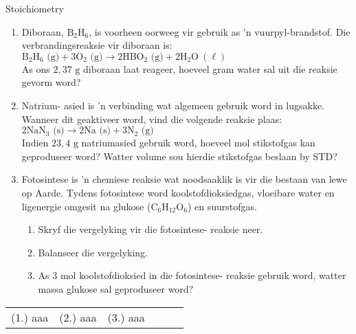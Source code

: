 \begin{exercises}{Stoichiometry}
            \nopagebreak \noindent
      \label{m38712*id285393}\begin{enumerate}[noitemsep, label=\textbf{\arabic*}. ] 
            \label{m38712*uid101}\item Diboraan, $\text{B}{}_{2}\text{H}{}_{6}$, is voorheen oorweeg vir gebruik as 'n vuurpyl-brandstof. Die verbrandingsreaksie vir diboraan is:\\
${\text{B}}_{2}{\text{H}}_{6} \text{ (g)} + 3{\text{O}}_{2} \text{ (g)} \to 2\text{H}\text{B}{\text{O}}_{2} \text{ (g)} + 2{\text{H}}_{2}\text{O} ~\left( \ell \right)$\\
As ons $2,37 \text{ g}$ diboraan laat reageer, hoeveel gram water sal uit die reaksie gevorm word?
\item Natrium- asied is 'n verbinding wat algemeen gebruik word in lugsakke. Wanneer dit geaktiveer word, vind die volgende reaksie plaas: \\
$2{\text{NaN}}_{3} \text{ (s)} \to 2\text{Na} \text{ (s)} + 3{\text{N}}_{2} \text{ (g)}$\\
Indien $23,4 \text{ g}$ natriumasied gebruik word, hoeveel mol stikstofgas kan geproduseer word? Watter volume sou hierdie stikstofgas beslaan by STD?
\label{m38712*uid103}\item Fotosintese is 'n chemiese reaksie wat noodsaaklik is vir die bestaan ​​van lewe op
         Aarde. Tydens fotosintese word koolstofdioksiedgas, vloeibare water en ligenergie omgesit na glukose ($\text{C}{}_{6}\text{H}{}_{12}\text{O}{}_{6}$) en suurstofgas.
\label{m38712*id285674}\begin{enumerate}[noitemsep, label=\textbf{\alph*}. ] 
            \label{m38712*uid104}\item Skryf die vergelyking vir die fotosintese- reaksie neer.
\label{m38712*uid105}\item Balanseer die vergelyking.
\label{m38712*uid106}\item As $3 \text{ mol}$ koolstofdioksied in die fotosintese- reaksie gebruik word, watter massa glukose sal geproduseer word?
\end{enumerate}
                \end{enumerate}
\practiceinfo
\par 
 \par \begin{tabular}[h]{cccccc}
 (1.) aaa  &  (2.) aaa  &  (3.) aaa  & \end{tabular}
\end{exercises}

